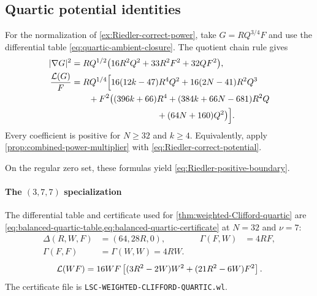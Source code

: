 \subsection{Quartic potential identities}
\label{app:quartic-potential-details}

For the normalization of \cref{ex:Riedler-correct-power}, take
$G=RQ^{3/4}F$ and use the differential table
\eqref{eq:quartic-ambient-closure}.
The quotient chain rule gives
\begin{align}
 |\nabla G|^2
 &=RQ^{1/2}\bigl(16R^2Q^2+33R^2F^2+32QF^2\bigr),
 \label{eq:Riedler-correct-gradient}\\
 \frac{\cL(G)}{F}
 &=RQ^{1/4}\Bigl[
 16(12k-47)R^4Q^2+16(2N-41)R^2Q^3\notag\\
 &\qquad
 +F^2\bigl((396k+66)R^4+(384k+66N-681)R^2Q\notag\\
 &\hspace{35mm} +(64N+160)Q^2\bigr)\Bigr].
 \label{eq:Riedler-correct-defect}
\end{align}
Every coefficient is positive for $N\geq32$ and $k\geq4$.
Equivalently, apply \cref{prop:combined-power-multiplier} with
\eqref{eq:Riedler-correct-potential}.


On the regular zero set, these formulas yield
\eqref{eq:Riedler-positive-boundary}.

\paragraph*{The $(3,7,7)$ specialization}
The differential table and certificate used for
\cref{thm:weighted-Clifford-quartic} are
\cref{eq:balanced-quartic-table,eq:balanced-quartic-certificate}
at $N=32$ and $\nu=7$:
\begin{equation}\label{eq:weighted-Clifford-table}
 \begin{aligned}
 \Delta(R,W,F)&=(64,28R,0),&\quad \Gamma(F,W)&=4RF,\\
 \Gamma(F,F)&=\Gamma(W,W)=4RW.
 \end{aligned}
\end{equation}
\begin{equation}\label{eq:weighted-Clifford-certificate}
 \mathcal L(WF)=16WF\left[(3R^2-2W)W^2+(21R^2-6W)F^2\right].
\end{equation}
The certificate file is
\nolinkurl{LSC-WEIGHTED-CLIFFORD-QUARTIC.wl}.
